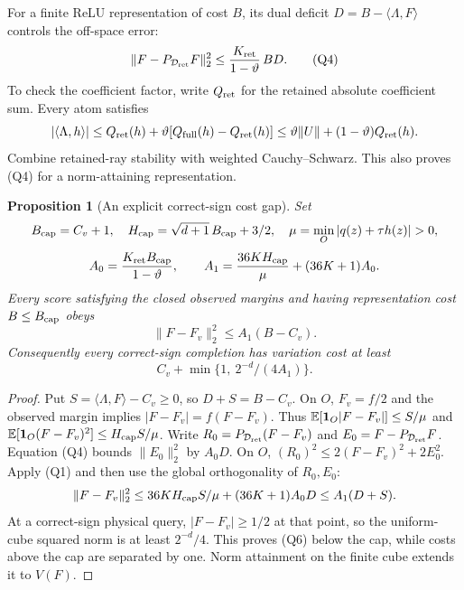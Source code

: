 \documentclass[11pt]{article}
\newtheorem{proposition}[theorem]{Proposition}
\newcommand{\one}{\mathbf1}\newcommand{\relu}{\operatorname{ReLU}}
\begin{document}
For a finite ReLU representation of cost $B$, its dual deficit
$D=B-\langle\Lambda,F\rangle$ controls the off-space error:
\[
       \|F-P_{\mathcal D_{\rm ret}}F\|_2^2
               \le\frac{K_{\rm ret}}{1-\vartheta}\,BD.   \tag{Q4}
\]
To check the coefficient factor, write $Q_{\rm ret}$ for the retained
absolute coefficient sum. Every atom satisfies
\[
 |\langle\Lambda,h\rangle|
 \le Q_{\rm ret}(h)+\vartheta[Q_{\rm full}(h)-Q_{\rm ret}(h)]
 \le\vartheta\|U\|+(1-\vartheta)Q_{\rm ret}(h).
\]
Combine retained-ray stability with weighted Cauchy--Schwarz.
This also proves (Q4) for a norm-attaining representation.

\begin{proposition}[An explicit correct-sign cost gap]\label{prop:quantgap}
Set
\[
 B_{\rm cap}=C_v+1,\quad
 H_{\rm cap}=\sqrt{d+1}\,B_{\rm cap}+3/2,\quad
 \mu=\min_O|q(z)+\tau h(z)|>0,
\]
\[
 A_0=\frac{K_{\rm ret}B_{\rm cap}}{1-\vartheta},\qquad
 A_1=\frac{36K H_{\rm cap}}\mu+(36K+1)A_0.
\]
Every score satisfying the closed observed margins and having
representation cost $B\le B_{\rm cap}$ obeys
\[
                        \|F-F_v\|_2^2\le A_1(B-C_v).     \tag{Q5}
\]
Consequently every correct-sign completion has variation cost at least
\[
                 C_v+\min\{1,\ 2^{-d}/(4A_1)\}.          \tag{Q6}
\]
\end{proposition}
\begin{proof}
Put $S=\langle\Lambda,F\rangle-C_v\ge0$, so $D+S=B-C_v$.
On $O$, $F_v=f/2$ and the observed margin implies
$|F-F_v|=f(F-F_v)$. Thus
$\E[\one_O|F-F_v|]\le S/\mu$ and
$\E[\one_O(F-F_v)^2]\le H_{\rm cap}S/\mu$.
Write $R_0=P_{\mathcal D_{\rm ret}}(F-F_v)$ and
$E_0=F-P_{\mathcal D_{\rm ret}}F$. Equation (Q4) bounds
$\|E_0\|_2^2$ by $A_0D$.
On $O$, $(R_0)^2\le2(F-F_v)^2+2E_0^2$.
Apply (Q1) and then use the global orthogonality of $R_0,E_0$:
\[
 \|F-F_v\|_2^2
 \le36K H_{\rm cap}S/\mu+(36K+1)A_0D
 \le A_1(D+S).
\]
At a correct-sign physical query, $|F-F_v|\ge1/2$ at that point,
so the uniform-cube squared norm is at least $2^{-d}/4$.
This proves (Q6) below the cap, while costs above the cap are separated
by one. Norm attainment on the finite cube extends it to $V(F)$.
\end{proof}
\end{document}
